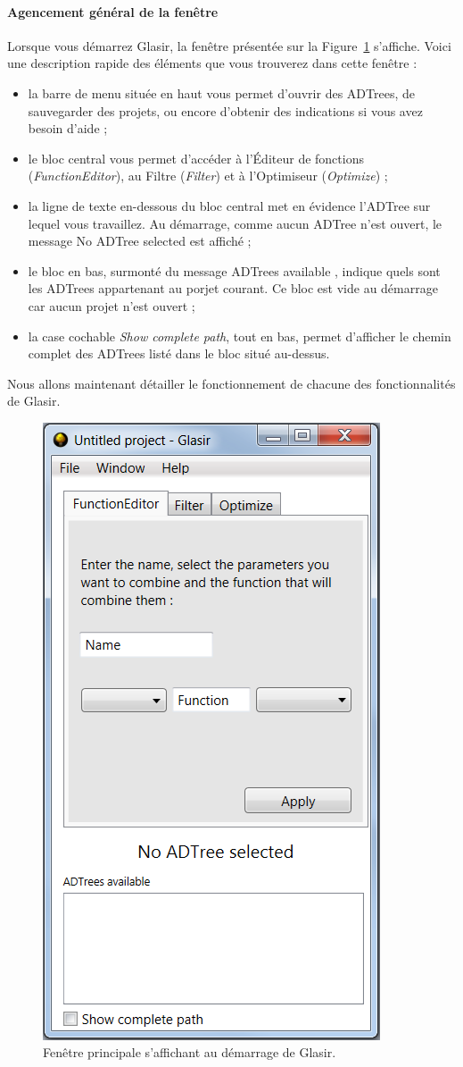 \paragraph{Agencement général de la fenêtre}
Lorsque vous démarrez Glasir, la fenêtre présentée sur la {\sc Figure}~\ref{fig:princ} s'affiche. Voici une description rapide des éléments que vous trouverez dans cette fenêtre :
\begin{itemize}
	\item  la barre de menu située en haut vous permet d'ouvrir des ADTrees, de sauvegarder des projets, ou encore d'obtenir des indications si vous avez besoin d'aide ;
	\item le bloc central vous permet d'accéder à l'Éditeur de fonctions (\emph{FunctionEditor}), au Filtre (\emph{Filter}) et à l'Optimiseur (\emph{Optimize}) ;
	\item la ligne de texte en-dessous du bloc central met en évidence l'ADTree sur lequel vous travaillez. Au démarrage, comme aucun ADTree n'est ouvert, le message \og No ADTree selected \fg{} est affiché ;
	\item le bloc en bas, surmonté du message \og ADTrees available \fg{}, indique quels sont les ADTrees appartenant au porjet courant. Ce bloc est vide au démarrage car aucun projet n'est ouvert ;
	\item la case cochable \emph{Show complete path}, tout en bas, permet d'afficher le chemin complet des ADTrees listé dans le bloc situé au-dessus.
	\end{itemize}
	
	Nous allons maintenant détailler le fonctionnement de chacune des fonctionnalités de Glasir.
	
	\begin{figure}[H]
        \centering
        \includegraphics[height=0.7\textwidth]{figure/glasirFenetrePrincipale.png}
        \caption{Fenêtre principale s'affichant au démarrage de Glasir.}
        \label{fig:princ}
    \end{figure}

